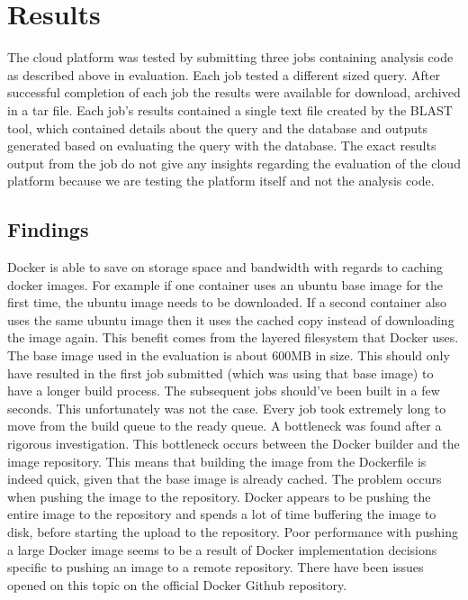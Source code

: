 \documentclass{sig-alternate-05-2015}
\begin{document}
\section{Results}
The cloud platform was tested by submitting three jobs containing analysis code as described above in evaluation. Each job tested a different sized query. After successful completion of each job the results were available for download, archived in a tar file. Each job's results contained a single text file created by the BLAST tool, which contained details about the query and the database and outputs generated based on evaluating the query with the database. The exact results output from the job do not give any insights regarding the evaluation of the cloud platform because we are testing the platform itself and not the analysis code. 

\subsection{Findings}
Docker is able to save on storage space and bandwidth with regards to caching docker images. For example if one container uses an ubuntu base image for the first time, the ubuntu image needs to be downloaded. If a second container also uses the same ubuntu image then it uses the cached copy instead of downloading the image again. This benefit comes from the layered filesystem that Docker uses. 
The base image used in the evaluation is about 600MB in size. This should only have resulted in the first job submitted (which was using that base image) to have a longer build process. The subsequent jobs should've been built in a few seconds. This unfortunately was not the case. Every job took extremely long to move from the build queue to the ready queue. A bottleneck was found after a rigorous investigation. This bottleneck occurs between the Docker builder and the image repository. This means that building the image from the Dockerfile is indeed quick, given that the base image is already cached. The problem occurs when pushing the image to the repository. Docker appears to be pushing the entire image to the repository and spends a lot of time buffering the image to disk, before starting the upload to the repository. Poor performance with pushing a large Docker image seems to be a result of Docker implementation decisions specific to pushing an image to a remote repository. There have been issues opened on this topic on the official Docker Github repository.
\\\\
\end{document}
